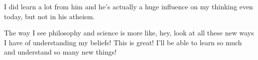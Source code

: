 \begin{compactitem}
\begin{compactitem}
\begin{compactitem}
							\item I did learn a lot from him and he's actually a huge influence on my thinking even today, but not in his atheism.
						\end{compactitem}
					\item The way I see philosophy and science is more like, hey, look at all these new ways I have of understanding my beliefs! This is great! I'll be able to learn so much and understand so many new things!
				\end{compactitem}
				

\end{compactitem}
